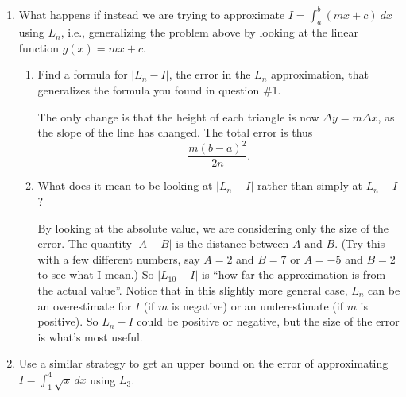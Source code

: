 \documentclass[main]{subfiles}
\begin{document}
\begin{enumerate}
\begin{solution}
  \end{solution}



  \item
  \begin{problem}
    What happens if instead we are trying to approximate $\displaystyle I = \int_a^b (mx+c) \ dx$ using $L_n$, i.e., generalizing the problem above by looking at the linear function $g(x) = mx + c$.  
  \end{problem}

  \begin{enumerate}
    \item 
    \begin{problem}[\vfill]
    Find a formula for $|L_n - I|$, the error in the $L_n$ approximation, that generalizes the formula you found in question \#1.
    \end{problem}

    \begin{solution}
    The only change is that the height of each triangle is now $\Delta y = m\Delta x$, as the slope of the line has changed.  The total error is thus
    $$\boxed{\frac{m(b-a)^{2}}{2n}}.$$
    \end{solution}

    \item 
    \begin{problem}[.7in]
    What does it mean to be looking at $|L_{n} - I |$ rather than simply at $L_{n}-I$?
    \end{problem}

    \begin{solution}
    By looking at the absolute value, we are considering only the size of the error.  The quantity $|A-B|$ is the distance between $A$ and $B$.   (Try this with a few different numbers, say $A=2$ and $B=7$  or $A=-5$ and $B=2$ to see what I mean.)  So $|L_{10} - I|$ is ``how far the approximation is from the actual value''.  Notice that in this slightly more general case, $L_n$ can be an overestimate for $I$ (if $m$ is negative) or an underestimate (if $m$ is positive).  So $L_n-I$ could be positive or negative, but the size of the error is what's most useful.
    \end{solution} 


  \end{enumerate}
  \pspace{\newpage}
\item \begin{problem}[\vfill]
    Use a similar strategy to get an upper bound on the error of approximating $I=\displaystyle\int_1^4\sqrt{x}\,dx$ using $L_3$. 
\end{problem}


\end{enumerate}
\end{document}
